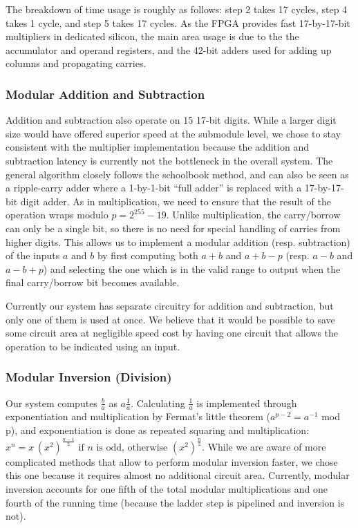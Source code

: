 The breakdown of time usage is roughly as follows: step 2 takes 17
cycles, step 4 takes 1 cycle, and step 5 takes 17 cycles. As the FPGA
provides fast 17-by-17-bit multipliers in dedicated silicon, the main
area usage is due to the the accumulator and operand registers, and the
42-bit adders used for adding up columns and propagating carries.

\subsubsection{Modular Addition and
Subtraction}\label{modular-addition-and-subtraction}

Addition and subtraction also operate on 15 17-bit digits. While a
larger digit size would have offered superior speed at the submodule
level, we chose to stay consistent with the multiplier implementation
because the addition and subtraction latency is currently not the
bottleneck in the overall system. The general algorithm closely follows
the schoolbook method, and can also be seen as a ripple-carry adder
where a 1-by-1-bit ``full adder'' is replaced with a 17-by-17-bit digit
adder. As in multiplication, we need to ensure that the result of the
operation wraps modulo \(p=2^{255}-19\). Unlike multiplication, the
carry/borrow can only be a single bit, so there is no need for special
handling of carries from higher digits. This allows us to implement a
modular addition (resp. subtraction) of the inputs \(a\) and \(b\) by
first computing both \(a+b\) and \(a+b-p\) (resp. \(a-b\) and \(a-b+p\))
and selecting the one which is in the valid range to output when the
final carry/borrow bit becomes available.

Currently our system has separate circuitry for addition and
subtraction, but only one of them is used at once. We believe that it
would be possible to save some circuit area at negligible speed cost by
having one circuit that allows the operation to be indicated using an
input.

\subsubsection{Modular Inversion
(Division)}\label{modular-inversion-division}

Our system computes \(\frac{b}{a}\) as \(a \frac{1}{a}\). Calculating
\(\frac{1}{a}\) is implemented through exponentiation and multiplication
by Fermat's little theorem (\(a^{p-2} = a^{-1}\) mod p), and
exponentiation is done as repeated squaring and multiplication:
\(x^n= x \, ( x^{2})^{\frac{n - 1}{2}} \mbox{ if } n \mbox{ is odd, otherwise } (x^{2})^{\frac{n}{2}}\).
While we are aware of more complicated methods that allow to perform
modular inversion faster, we chose this one because it requires almost
no additional circuit area. Currently, modular inversion accounts for
one fifth of the total modular multiplications and one fourth of the
running time (because the ladder step is pipelined and inversion is
not).

